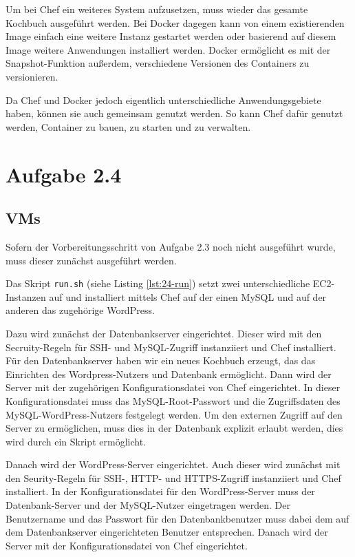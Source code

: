 \documentclass[a4paper]{scrartcl}
\begin{document}
Um bei Chef ein weiteres System aufzusetzen, muss wieder das gesamte Kochbuch ausgeführt werden. Bei Docker dagegen kann von einem existierenden Image einfach eine weitere Instanz gestartet werden oder basierend auf diesem Image weitere Anwendungen installiert werden. Docker ermöglicht es mit der Snapshot-Funktion außerdem, verschiedene Versionen des Containers zu versionieren.

Da Chef und Docker jedoch eigentlich unterschiedliche Anwendungsgebiete haben, können sie auch gemeinsam genutzt werden. So kann Chef dafür genutzt werden, Container zu bauen, zu starten und zu verwalten. 

\section*{Aufgabe 2.4}
\subsection*{VMs}
Sofern der Vorbereitungsschritt von Aufgabe 2.3 noch nicht ausgeführt wurde, muss dieser zunächst ausgeführt werden.

Das Skript \texttt{run.sh} (siehe Listing \ref{lst:24-run}) setzt zwei unterschiedliche EC2-Instanzen auf und installiert mittels Chef auf der einen MySQL und auf der anderen das zugehörige WordPress. 

Dazu wird zunächst der Datenbankserver eingerichtet. Dieser wird mit den Secruity-Regeln für SSH- und MySQL-Zugriff instanziiert und Chef installiert. Für den Datenbankserver haben wir ein neues Kochbuch erzeugt, das das Einrichten des Wordpress-Nutzers und Datenbank ermöglicht. Dann wird der Server mit der zugehörigen Konfigurationsdatei von Chef eingerichtet. In dieser Konfigurationsdatei muss das MySQL-Root-Passwort und die Zugriffsdaten des MySQL-WordPress-Nutzers festgelegt werden. Um den externen Zugriff auf den Server zu ermöglichen, muss dies in der Datenbank explizit erlaubt werden, dies wird durch ein Skript ermöglicht. 

Danach wird der WordPress-Server eingerichtet. Auch dieser wird zunächst mit den Seurity-Regeln für SSH-, HTTP- und HTTPS-Zugriff instanziiert und Chef installiert. In der Konfigurationsdatei für den WordPress-Server muss der Datenbank-Server und der MySQL-Nutzer eingetragen werden. Der Benutzername und das Passwort für den Datenbankbenutzer muss dabei dem auf dem Datenbankserver eingerichteten Benutzer entsprechen. Danach wird der Server mit der Konfigurationsdatei von Chef eingerichtet.
\end{document}
